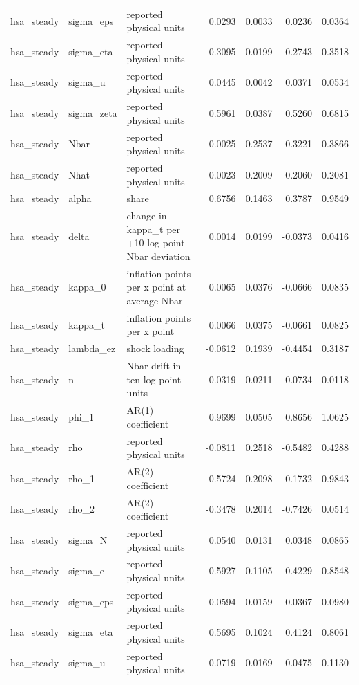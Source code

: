\begin{tabular}{lllrrrr}
hsa\_steady & sigma\_eps & reported physical units & 0.0293 & 0.0033 & 0.0236 & 0.0364 \\
hsa\_steady & sigma\_eta & reported physical units & 0.3095 & 0.0199 & 0.2743 & 0.3518 \\
hsa\_steady & sigma\_u & reported physical units & 0.0445 & 0.0042 & 0.0371 & 0.0534 \\
hsa\_steady & sigma\_zeta & reported physical units & 0.5961 & 0.0387 & 0.5260 & 0.6815 \\
hsa\_steady & Nbar & reported physical units & -0.0025 & 0.2537 & -0.3221 & 0.3866 \\
hsa\_steady & Nhat & reported physical units & 0.0023 & 0.2009 & -0.2060 & 0.2081 \\
hsa\_steady & alpha & share & 0.6756 & 0.1463 & 0.3787 & 0.9549 \\
hsa\_steady & delta & change in kappa\_t per +10 log-point Nbar deviation & 0.0014 & 0.0199 & -0.0373 & 0.0416 \\
hsa\_steady & kappa\_0 & inflation points per x point at average Nbar & 0.0065 & 0.0376 & -0.0666 & 0.0835 \\
hsa\_steady & kappa\_t & inflation points per x point & 0.0066 & 0.0375 & -0.0661 & 0.0825 \\
hsa\_steady & lambda\_ez & shock loading & -0.0612 & 0.1939 & -0.4454 & 0.3187 \\
hsa\_steady & n & Nbar drift in ten-log-point units & -0.0319 & 0.0211 & -0.0734 & 0.0118 \\
hsa\_steady & phi\_1 & AR(1) coefficient & 0.9699 & 0.0505 & 0.8656 & 1.0625 \\
hsa\_steady & rho & reported physical units & -0.0811 & 0.2518 & -0.5482 & 0.4288 \\
hsa\_steady & rho\_1 & AR(2) coefficient & 0.5724 & 0.2098 & 0.1732 & 0.9843 \\
hsa\_steady & rho\_2 & AR(2) coefficient & -0.3478 & 0.2014 & -0.7426 & 0.0514 \\
hsa\_steady & sigma\_N & reported physical units & 0.0540 & 0.0131 & 0.0348 & 0.0865 \\
hsa\_steady & sigma\_e & reported physical units & 0.5927 & 0.1105 & 0.4229 & 0.8548 \\
hsa\_steady & sigma\_eps & reported physical units & 0.0594 & 0.0159 & 0.0367 & 0.0980 \\
hsa\_steady & sigma\_eta & reported physical units & 0.5695 & 0.1024 & 0.4124 & 0.8061 \\
hsa\_steady & sigma\_u & reported physical units & 0.0719 & 0.0169 & 0.0475 & 0.1130 \\

\end{tabular}
